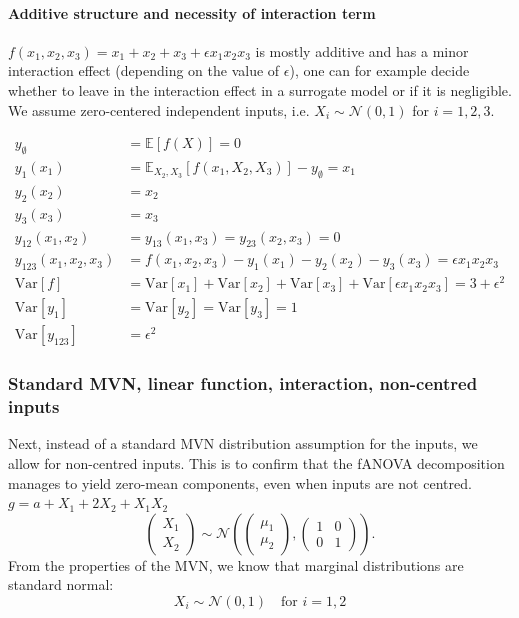 \paragraph{Additive structure and necessity of interaction term}
$f(x_1, x_2, x_3) = x_1 + x_2 + x_3 + \epsilon x_1 x_2 x_3$ is mostly additive and has a minor interaction effect (depending on the value of $\epsilon$), one can for example decide whether to leave in the interaction effect in a surrogate model or if it is negligible.
We assume zero-centered independent inputs, i.e. $X_i \sim \mathcal{N}(0, 1)$ for $i = 1, 2, 3$.

\begin{align*}
y_\emptyset &= \mathbb{E}[f(X)] = 0 \\
y_1(x_1) &= \mathbb{E}_{X_2, X_3}[f(x_1, X_2, X_3)] - y_\emptyset = x_1 \\
y_2(x_2) &= x_2 \\
y_3(x_3) &= x_3 \\
y_{12}(x_1, x_2) &= y_{13}(x_1, x_3) = y_{23}(x_2, x_3) = 0 \\
y_{123}(x_1, x_2, x_3) &= f(x_1, x_2, x_3) - y_1(x_1) - y_2(x_2) - y_3(x_3) = \epsilon x_1 x_2 x_3 \\
\mathrm{Var}[f] &= \mathrm{Var}[x_1] + \mathrm{Var}[x_2] + \mathrm{Var}[x_3] + \mathrm{Var}[\epsilon x_1 x_2 x_3] = 3 + \epsilon^2 \\
\mathrm{Var}[y_1] &= \mathrm{Var}[y_2] = \mathrm{Var}[y_3] = 1 \\
\mathrm{Var}[y_{123}] &= \epsilon^2
\end{align*}



\subsubsection*{Standard MVN, linear function, interaction, non-centred inputs}
Next, instead of a standard MVN distribution assumption for the inputs, we allow for non-centred inputs. This is to confirm that the fANOVA decomposition manages to yield zero-mean components, even when inputs are not centred.
\(g = a + X_1 + 2X_2 + X_1 X_2\)
\[
\begin{pmatrix}
X_1 \\
X_2
\end{pmatrix}
\sim \mathcal{N}\left(
\begin{pmatrix} \mu_1 \\ \mu_2 \end{pmatrix},
\begin{pmatrix}
1 & 0 \\
0 & 1
\end{pmatrix}
\right).
\]
From the properties of the MVN, we know that marginal distributions are standard normal:
\[
X_i \sim \mathcal{N}(0, 1) \quad \text{for } i = 1, 2
\]

